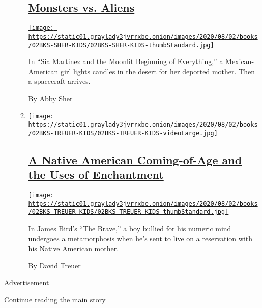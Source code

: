 \begin{enumerate}
\begin{enumerate}
    \hypertarget{monsters-vs-aliens}{%
    \subsection{\texorpdfstring{\href{/2020/07/31/books/review/sia-martinez-and-the-moonlit-beginning-of-everything-raquel-vasquez-gilliland.html}{Monsters
    vs. Aliens}}{Monsters vs. Aliens}}\label{monsters-vs-aliens}}

    \href{/2020/07/31/books/review/sia-martinez-and-the-moonlit-beginning-of-everything-raquel-vasquez-gilliland.html}{\texttt{[image: https://static01.graylady3jvrrxbe.onion/images/2020/08/02/books/02BKS-SHER-KIDS/02BKS-SHER-KIDS-thumbStandard.jpg]}}

    In ``Sia Martinez and the Moonlit Beginning of Everything,'' a
    Mexican-American girl lights candles in the desert for her deported
    mother. Then a spacecraft arrives.

    By Abby Sher
  \item
    \texttt{[image: https://static01.graylady3jvrrxbe.onion/images/2020/08/02/books/02BKS-TREUER-KIDS/02BKS-TREUER-KIDS-videoLarge.jpg]}

    \hypertarget{a-native-american-coming-of-age-and-the-uses-of-enchantment}{%
    \subsection{\texorpdfstring{\href{/2020/07/31/books/review/the-brave-james-bird.html}{A
    Native American Coming-of-Age and the Uses of
    Enchantment}}{A Native American Coming-of-Age and the Uses of Enchantment}}\label{a-native-american-coming-of-age-and-the-uses-of-enchantment}}

    \href{/2020/07/31/books/review/the-brave-james-bird.html}{\texttt{[image: https://static01.graylady3jvrrxbe.onion/images/2020/08/02/books/02BKS-TREUER-KIDS/02BKS-TREUER-KIDS-thumbStandard.jpg]}}

    In James Bird's ``The Brave,'' a boy bullied for his numeric mind
    undergoes a metamorphosis when he's sent to live on a reservation
    with his Native American mother.

    By David Treuer
  \end{enumerate}
\end{enumerate}

Advertisement

\protect\hyperlink{after-mid1}{Continue reading the main story}

\subsection{\texorpdfstring{\protect\hyperlink{}{}}{}}

